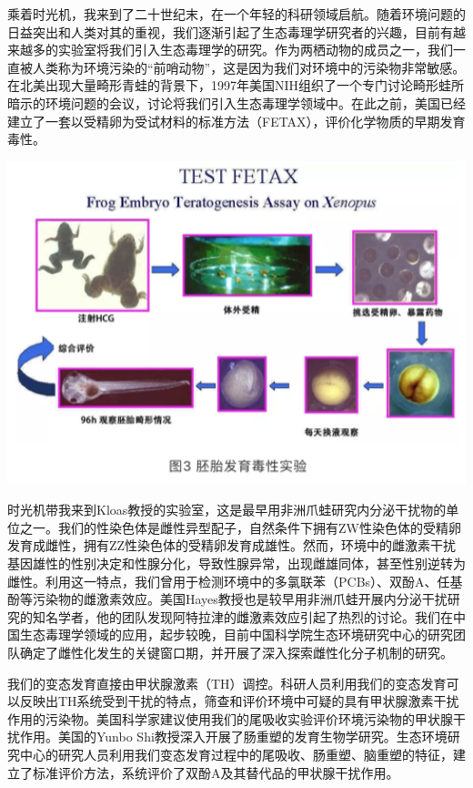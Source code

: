 \documentclass[]{book}
\begin{document}
乘着时光机，我来到了二十世纪末，在一个年轻的科研领域启航。随着环境问题的日益突出和人类对其的重视，我们逐渐引起了生态毒理学研究者的兴趣，目前有越来越多的实验室将我们引入生态毒理学的研究。作为两栖动物的成员之一，我们一直被人类称为环境污染的``前哨动物''，这是因为我们对环境中的污染物非常敏感。在北美出现大量畸形青蛙的背景下，1997年美国NIH组织了一个专门讨论畸形蛙所暗示的环境问题的会议，讨论将我们引入生态毒理学领域中。在此之前，美国已经建立了一套以受精卵为受试材料的标准方法（FETAX），评价化学物质的早期发育毒性。

\includegraphics[width=6.67in]{images/qingwa3}

时光机带我来到Kloas教授的实验室，这是最早用非洲爪蛙研究内分泌干扰物的单位之一。我们的性染色体是雌性异型配子，自然条件下拥有ZW性染色体的受精卵发育成雌性，拥有ZZ性染色体的受精卵发育成雄性。然而，环境中的雌激素干扰基因雄性的性别决定和性腺分化，导致性腺异常，出现雌雄同体，甚至性别逆转为雌性。利用这一特点，我们曾用于检测环境中的多氯联苯（PCBs）、双酚A、任基酚等污染物的雌激素效应。美国Hayes教授也是较早用非洲爪蛙开展内分泌干扰研究的知名学者，他的团队发现阿特拉津的雌激素效应引起了热烈的讨论。我们在中国生态毒理学领域的应用，起步较晚，目前中国科学院生态环境研究中心的研究团队确定了雌性化发生的关键窗口期，并开展了深入探索雌性化分子机制的研究。

我们的变态发育直接由甲状腺激素（TH）调控。科研人员利用我们的变态发育可以反映出TH系统受到干扰的特点，筛查和评价环境中可疑的具有甲状腺激素干扰作用的污染物。美国科学家建议使用我们的尾吸收实验评价环境污染物的甲状腺干扰作用。美国的Yunbo Shi教授深入开展了肠重塑的发育生物学研究。生态环境研究中心的研究人员利用我们变态发育过程中的尾吸收、肠重塑、脑重塑的特征，建立了标准评价方法，系统评价了双酚A及其替代品的甲状腺干扰作用。
\end{document}
